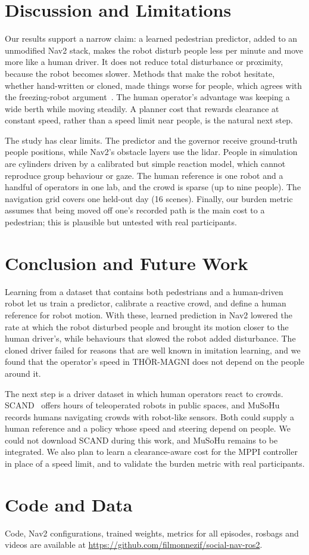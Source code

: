 \documentclass[conference]{IEEEtran}
\begin{document}
\section{Discussion and Limitations}
Our results support a narrow claim: a learned pedestrian predictor, added to an unmodified Nav2 stack, makes the robot disturb people less per minute and move more like a human driver. It does not reduce total disturbance or proximity, because the robot becomes slower. Methods that make the robot hesitate, whether hand-written or cloned, made things worse for people, which agrees with the freezing-robot argument~\cite{trautman2010unfreezing}. The human operator's advantage was keeping a wide berth while moving steadily. A planner cost that rewards clearance at constant speed, rather than a speed limit near people, is the natural next step.

The study has clear limits. The predictor and the governor receive ground-truth people positions, while Nav2's obstacle layers use the lidar. People in simulation are cylinders driven by a calibrated but simple reaction model, which cannot reproduce group behaviour or gaze. The human reference is one robot and a handful of operators in one lab, and the crowd is sparse (up to nine people). The navigation grid covers one held-out day (16 scenes). Finally, our burden metric assumes that being moved off one's recorded path is the main cost to a pedestrian; this is plausible but untested with real participants.

\section{Conclusion and Future Work}
Learning from a dataset that contains both pedestrians and a human-driven robot let us train a predictor, calibrate a reactive crowd, and define a human reference for robot motion. With these, learned prediction in Nav2 lowered the rate at which the robot disturbed people and brought its motion closer to the human driver's, while behaviours that slowed the robot added disturbance. The cloned driver failed for reasons that are well known in imitation learning, and we found that the operator's speed in TH\"OR-MAGNI does not depend on the people around it.

The next step is a driver dataset in which human operators react to crowds. SCAND~\cite{karnan2022scand} offers hours of teleoperated robots in public spaces, and MuSoHu~\cite{nguyen2023musohu} records humans navigating crowds with robot-like sensors. Both could supply a human reference and a policy whose speed and steering depend on people. We could not download SCAND during this work, and MuSoHu remains to be integrated. We also plan to learn a clearance-aware cost for the MPPI controller in place of a speed limit, and to validate the burden metric with real participants.

\section*{Code and Data}
Code, Nav2 configurations, trained weights, metrics for all episodes, rosbags and videos are available at \url{https://github.com/filmonnezif/social-nav-ros2}.



\end{document}
